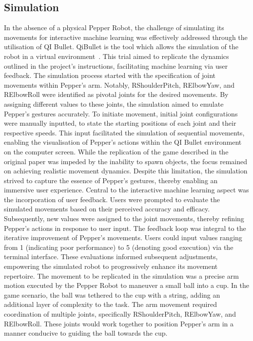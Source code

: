 \documentclass{article}
\begin{document}
    \subsection{Simulation}
    In the absence of a physical Pepper Robot, the challenge of simulating its movements for interactive machine learning
    was effectively addressed through the utilisation of QI Bullet.
    QiBullet is the tool which allows the simulation of the robot in a virtual environment~\cite{QiBullet}.
    This trial aimed to replicate the dynamics outlined in the project's instructions, facilitating machine learning via
    user feedback.
    \newline The simulation process started with the specification of joint movements within Pepper's arm.
    Notably, RShoulderPitch, RElbowYaw, and RElbowRoll were identified as pivotal joints for the desired movements.
    By assigning different values to these joints, the simulation aimed to emulate Pepper's gestures accurately.
    \newline To initiate movement, initial joint configurations were manually inputted, to state the starting positions of each joint
    and their respective speeds.
    This input facilitated the simulation of sequential movements, enabling the visualisation of Pepper's actions within the
    QI Bullet environment on the computer screen.
    While the replication of the game described in the original paper was impeded by the inability to spawn objects, the
    focus remained on achieving realistic movement dynamics.
    Despite this limitation, the simulation strived to capture the essence of Pepper's gestures, thereby enabling an
    immersive user experience.
    Central to the interactive machine learning aspect was the incorporation of user feedback.
    Users were prompted to evaluate the simulated movements based on their perceived accuracy and efficacy.
    Subsequently, new values were assigned to the joint movements, thereby refining Pepper's actions in response to user input.
    The feedback loop was integral to the iterative improvement of Pepper's movements.
    Users could input values ranging from 1 (indicating poor performance) to 5 (denoting good execution) via the terminal interface.
    These evaluations informed subsequent adjustments, empowering the simulated robot to progressively enhance its movement repertoire.
    \newline The movement to be replicated in the simulation was a precise arm motion executed by the Pepper Robot to maneuver a small ball into a cup. In the game scenario, the ball was tethered to the cup with a string, adding an additional layer of complexity to the task.
    The arm movement required coordination of multiple joints, specifically RShoulderPitch, RElbowYaw, and RElbowRoll. These joints would work together to position Pepper's arm in a manner conducive to guiding the ball towards the cup.
\end{document}
